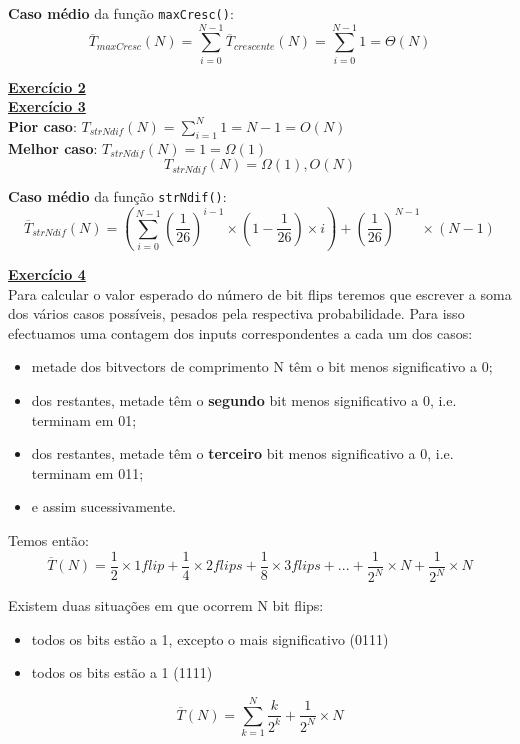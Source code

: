 \documentclass[a4paper,11pt]{article}
\begin{document}
	\noindent \textbf{Caso médio} da função \texttt{maxCresc()}:
	\[
		\overline{T}_{maxCresc}(N) = \sum_{i=0}^{N-1} \overline{T}_{crescente}(N) = \sum_{i=0}^{N-1} 1 = \Theta(N)
	\]
	
	\newpage
	
	
	\noindent \underline{\textbf{Exercício 2}}\\
	
	
	
	\noindent \underline{\textbf{Exercício 3}}\\
	
	\noindent \textbf{Pior caso}: $ T_{strNdif}(N) = \sum_{i=1}^{N} 1 = N - 1 = O(N) $\\
	
	\noindent \textbf{Melhor caso}: $ T_{strNdif}(N) = 1 = \Omega(1) $\\
	\[
		T_{strNdif}(N) = \Omega(1), O(N)
	\]
	
	\noindent \textbf{Caso médio} da função \texttt{strNdif()}:
	\[
		\overline{T}_{strNdif}(N) = (\sum_{i=0}^{N-1} (\frac{1}{26})^{i-1} \times (1-\frac{1}{26}) \times i) + (\frac{1}{26})^{N-1} \times (N - 1)
	\]
	
	
	\noindent \underline{\textbf{Exercício 4}}\\
	
	\noindent Para calcular o valor esperado do número de bit flips teremos que escrever a soma dos vários casos possíveis, pesados pela respectiva probabilidade. Para isso efectuamos uma contagem dos inputs correspondentes a cada um dos casos:
	
	\begin{itemize}
		\item metade dos bitvectors de comprimento N têm o bit menos significativo a 0;
		\item dos restantes, metade têm o \textbf{segundo} bit menos significativo a 0, i.e. terminam em 01;
		\item dos restantes, metade têm o \textbf{terceiro} bit menos significativo a 0, i.e. terminam em 011;
		\item e assim sucessivamente.
	\end{itemize}
	
	\noindent Temos então:
	\[
		\overline{T}(N) = \frac{1}{2} \times 1 flip + \frac{1}{4} \times 2 flips + \frac{1}{8} \times 3 flips + ... + \frac{1}{2^N} \times N + \frac{1}{2^N} \times N
	\]
	
	\noindent Existem duas situações em que ocorrem N bit flips:
	
	\begin{itemize}
		\item todos os bits estão a 1, excepto o mais significativo (0111)
		\item todos os bits estão a 1 (1111)
	\end{itemize}
	\[
		\overline{T}(N) = \sum_{k=1}^{N} \frac{k}{2^k} + \frac{1}{2^N} \times N
	\]
	
\end{document}

